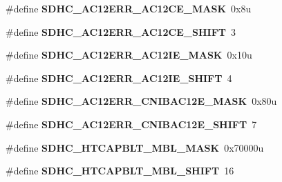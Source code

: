 \begin{DoxyCompactItemize}
\item 
\hypertarget{group___s_d_h_c___register___masks_gabefbec3e963ccb70de1fdc5b0bb06c14}{}\#define {\bfseries S\+D\+H\+C\+\_\+\+A\+C12\+E\+R\+R\+\_\+\+A\+C12\+C\+E\+\_\+\+M\+A\+S\+K}~0x8u\label{group___s_d_h_c___register___masks_gabefbec3e963ccb70de1fdc5b0bb06c14}

\item 
\hypertarget{group___s_d_h_c___register___masks_ga7b92a5f04788ce2cc5634ebf7f604a9b}{}\#define {\bfseries S\+D\+H\+C\+\_\+\+A\+C12\+E\+R\+R\+\_\+\+A\+C12\+C\+E\+\_\+\+S\+H\+I\+F\+T}~3\label{group___s_d_h_c___register___masks_ga7b92a5f04788ce2cc5634ebf7f604a9b}

\item 
\hypertarget{group___s_d_h_c___register___masks_ga83739f9ba43d7cded35950a1e98d2caa}{}\#define {\bfseries S\+D\+H\+C\+\_\+\+A\+C12\+E\+R\+R\+\_\+\+A\+C12\+I\+E\+\_\+\+M\+A\+S\+K}~0x10u\label{group___s_d_h_c___register___masks_ga83739f9ba43d7cded35950a1e98d2caa}

\item 
\hypertarget{group___s_d_h_c___register___masks_ga3bd5a3ae0633a0ab02becdb7422fa910}{}\#define {\bfseries S\+D\+H\+C\+\_\+\+A\+C12\+E\+R\+R\+\_\+\+A\+C12\+I\+E\+\_\+\+S\+H\+I\+F\+T}~4\label{group___s_d_h_c___register___masks_ga3bd5a3ae0633a0ab02becdb7422fa910}

\item 
\hypertarget{group___s_d_h_c___register___masks_gad096f631b95fe669726629c2c1f3fbee}{}\#define {\bfseries S\+D\+H\+C\+\_\+\+A\+C12\+E\+R\+R\+\_\+\+C\+N\+I\+B\+A\+C12\+E\+\_\+\+M\+A\+S\+K}~0x80u\label{group___s_d_h_c___register___masks_gad096f631b95fe669726629c2c1f3fbee}

\item 
\hypertarget{group___s_d_h_c___register___masks_gaa5735a7d405c4f7841b2f62c9a3cc841}{}\#define {\bfseries S\+D\+H\+C\+\_\+\+A\+C12\+E\+R\+R\+\_\+\+C\+N\+I\+B\+A\+C12\+E\+\_\+\+S\+H\+I\+F\+T}~7\label{group___s_d_h_c___register___masks_gaa5735a7d405c4f7841b2f62c9a3cc841}

\item 
\hypertarget{group___s_d_h_c___register___masks_gae49b97c8816777f7f7b5148f2b8ae5c1}{}\#define {\bfseries S\+D\+H\+C\+\_\+\+H\+T\+C\+A\+P\+B\+L\+T\+\_\+\+M\+B\+L\+\_\+\+M\+A\+S\+K}~0x70000u\label{group___s_d_h_c___register___masks_gae49b97c8816777f7f7b5148f2b8ae5c1}

\item 
\hypertarget{group___s_d_h_c___register___masks_gac68ea213ff8629145f7ad40c9525cffe}{}\#define {\bfseries S\+D\+H\+C\+\_\+\+H\+T\+C\+A\+P\+B\+L\+T\+\_\+\+M\+B\+L\+\_\+\+S\+H\+I\+F\+T}~16\label{group___s_d_h_c___register___masks_gac68ea213ff8629145f7ad40c9525cffe}


\end{DoxyCompactItemize}
